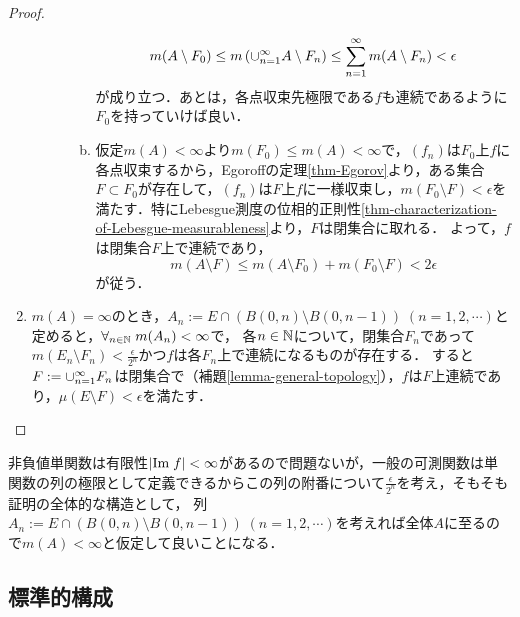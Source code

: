 \documentclass[uplatex, dvipdfmx]{jsreport}
\begin{document}
\begin{proof}
\begin{enumerate}
\begin{description}
\begin{enumerate}[(a)]
                \[m(A\setminus F_0)\le m\left(\cup_{n=1}^\infty A\setminus F_n\right)\le\sum_{n=1}^\infty m(A\setminus F_n)<\epsilon\]
                が成り立つ．あとは，各点収束先極限である$f$も連続であるように$F_0$を持っていけば良い．
                \item 仮定$m(A)<\infty$より$m(F_0)\le m(A)<\infty$で，$(f_n)$は$F_0$上$f$に各点収束するから，Egoroffの定理\ref{thm-Egorov}より，ある集合$F\subset F_0$が存在して，$(f_n)$は$F$上$f$に一様収束し，$m(F_0\setminus F)<\epsilon$を満たす．特にLebesgue測度の位相的正則性\ref{thm-characterization-of-Lebesgue-measurableness}より，$F$は閉集合に取れる．
                よって，$f$は閉集合$F$上で連続であり，
                \[m(A\setminus F)\le m(A\setminus F_0)+m(F_0\setminus F)<2\epsilon\]
                が従う．
            \end{enumerate}
        \end{description}
        \item $m(A)=\infty$のとき，$A_n:=E\cap(B(0,n)\setminus B(0,n-1))\;(n=1,2,\cdots)$と定めると，$\forall_{n\in\mathbb{N}}\;m(A_n)<\infty$で，
        各$n\in\mathbb{N}$について，閉集合$F_n$であって$m(E_n\setminus F_n)<\frac{\epsilon}{2^n}$かつ$f$は各$F_n$上で連続になるものが存在する．
        すると$F:=\cup_{n=1}^\infty F_n$は閉集合で（補題\ref{lemma-general-topology}），$f$は$F$上連続であり，$\mu(E\setminus F)<\epsilon$を満たす．
    \end{enumerate}
\end{proof}
\begin{remarks}[測度論の議論の仕方の特徴がよく出ている]
    非負値単関数は有限性$\lvert\mathrm{Im}\; f\rvert<\infty$があるので問題ないが，一般の可測関数は単関数の列の極限として定義できるからこの列の附番について$\frac{\epsilon}{2^n}$を考え，そもそも証明の全体的な構造として，
    列$A_n:=E\cap(B(0,n)\setminus B(0,n-1))\;(n=1,2,\cdots)$を考えれば全体$A$に至るので$m(A)<\infty$と仮定して良いことになる．
\end{remarks}

\subsection{標準的構成}
\end{document}
